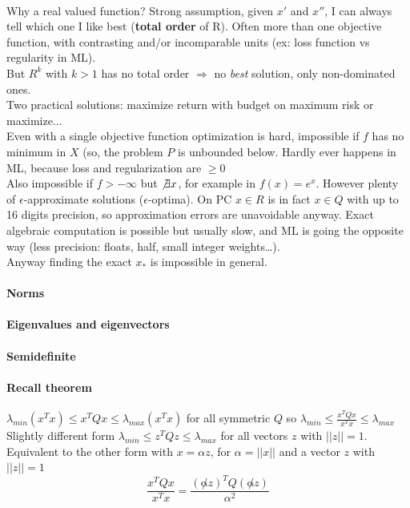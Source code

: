 \documentclass[10pt]{report}
\begin{document}
\paragraph{} Why a real valued function? Strong assumption, given $x'$ and $x''$, I can always tell which one I like best (\textbf{total order} of R). Often more than one objective function, with contrasting and/or incomparable units (ex: loss function vs regularity in ML).\\
But $R^k$ with $k > 1$ has no total order $\Rightarrow$ no \textit{best} solution, only non-dominated ones.\\
Two practical solutions: maximize return with budget on maximum risk or maximize...\\
Even with a single objective function optimization is hard, impossible if $f$ has no minimum in $X$ (so, the problem $P$ is unbounded below. Hardly ever happens in ML, because loss and regularization are $\geq 0$\\
Also impossible if $f > -\infty$ but $\not\exists x$, for example in $f(x) = e^x$. However plenty of $\epsilon$-approximate solutions ($\epsilon$-optima). On PC $x\in R$ is in fact $x\in Q$ with up to 16 digits precision, so approximation errors are unavoidable anyway. Exact algebraic computation is possible but usually slow, and ML is going the opposite way (less precision: floats, half, small integer weights\ldots).\\
Anyway finding the exact $x_*$ is impossible in general.
\paragraph{Norms}
\paragraph{Eigenvalues and eigenvectors}
\paragraph{Semidefinite}
\paragraph{Recall theorem} $\lambda_{min}(x^T x) \leq x^T Q x \leq \lambda_{max}(x^T x)$ for all symmetric $Q$ so $\lambda_{min} \leq \frac{x^T Q x}{x^T x} \leq \lambda_{max}$\\
Slightly different form $\lambda_{min} \leq z^T Q z \leq \lambda_{max}$ for all vectors $z$ with $||z|| = 1$. Equivalent to the other form with $x = \alpha z$, for $\alpha = ||x||$ and a vector $z$ with $||z|| = 1$
$$ \frac{x^T Q x}{x^T x} = \frac{(\not\alpha z)^T Q (\not\alpha z)}{\alpha^2}$$
\end{document}
